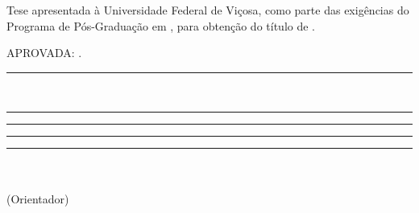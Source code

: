 \newpage
 \thispagestyle{empty}
 \setcounter{page}{1}
\begin{spacing}{1}
\begin{center}
{\MakeUppercase{\nome} \\ }

\vspace*{4.2cm}
{\MakeUppercase{\textbf{\titulo}} \\ }
\end{center}

\vspace*{2.6cm}
\singlespacing
\begin{flushright}
\begin{minipage}{7.5cm}
{Tese apresentada à Universidade Federal de Viçosa, como parte
  das exigências do Programa de Pós-Graduação em \programa, para
  obtenção do título de \textit{\titulop}.}
\end{minipage}
\end{flushright}
\vspace*{1.3cm}
%
%
APROVADA: \aprovacao.
\vfill
%
%
\begin{minipage}{0.45\linewidth}
\centering
\vspace{0.5cm}
\rule{\linewidth}{0.1mm}\\
{\membroa}%
\end{minipage}
\hfill
\begin{minipage}{0.45\linewidth}
\centering
\vspace*{0.5cm}
\rule{\linewidth}{0.1mm}
{\membrob}%
\end{minipage}
\vfill
\begin{minipage}{0.45\linewidth}
\centering
\rule{\linewidth}{0.1mm}
{\membroc}%
\end{minipage}
\hfill
\begin{minipage}{0.45\linewidth}
\centering
\rule{\linewidth}{0.1mm}
{\membrod}%
\end{minipage}

\vfill
\begin{center}
\begin{minipage}{7.5cm}
{\begin{center}
\rule{\linewidth}{0.1mm} \\
{\membroe}\\%
(Orientador)
\end{center}}
\end{minipage}
\end{center}
\end{spacing}

